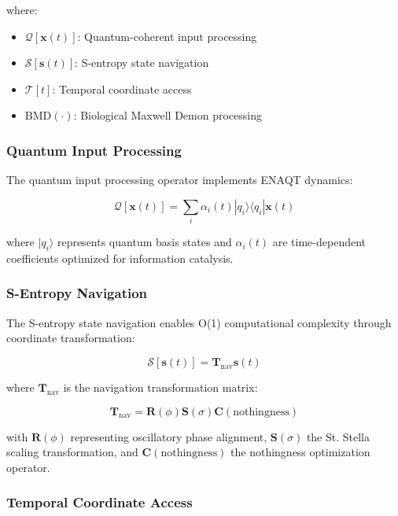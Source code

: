 \documentclass[12pt,a4paper]{article}
\theoremstyle{remark}
\begin{document}
where:
\begin{itemize}
\item $\mathcal{Q}[\mathbf{x}(t)]$: Quantum-coherent input processing
\item $\mathcal{S}[\mathbf{s}(t)]$: S-entropy state navigation
\item $\mathcal{T}[t]$: Temporal coordinate access
\item $\text{BMD}(\cdot)$: Biological Maxwell Demon processing
\end{itemize}

\subsubsection{Quantum Input Processing}

The quantum input processing operator implements ENAQT dynamics:

\begin{equation}
\mathcal{Q}[\mathbf{x}(t)] = \sum_i \alpha_i(t) |q_i\rangle \langle q_i| \mathbf{x}(t)
\end{equation}

where $|q_i\rangle$ represents quantum basis states and $\alpha_i(t)$ are time-dependent coefficients optimized for information catalysis.

\subsubsection{S-Entropy Navigation}

The S-entropy state navigation enables O(1) computational complexity through coordinate transformation:

\begin{equation}
\mathcal{S}[\mathbf{s}(t)] = \mathbf{T}_{\text{nav}} \mathbf{s}(t)
\end{equation}

where $\mathbf{T}_{\text{nav}}$ is the navigation transformation matrix:

\begin{equation}
\mathbf{T}_{\text{nav}} = \mathbf{R}(\phi) \mathbf{S}(\sigma) \mathbf{C}(\text{nothingness})
\end{equation}

with $\mathbf{R}(\phi)$ representing oscillatory phase alignment, $\mathbf{S}(\sigma)$ the St. Stella scaling transformation, and $\mathbf{C}(\text{nothingness})$ the nothingness optimization operator.

\subsubsection{Temporal Coordinate Access}
\end{document}
